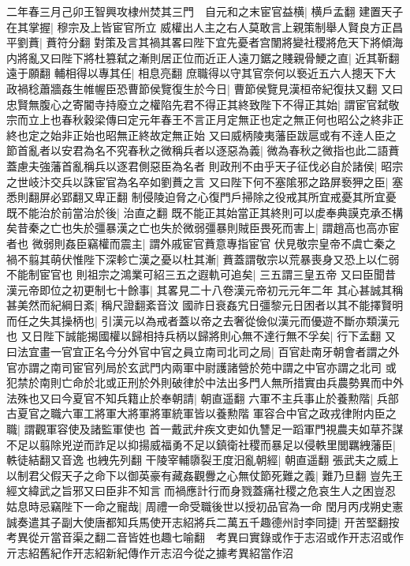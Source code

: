 二年春三月己卯王智興攻棣州焚其三門　自元和之末宦官益横|{
	横戶孟翻}
建置天子在其掌握|{
	穆宗及上皆宦官所立}
威權出人主之右人莫敢言上親策制舉人賢良方正昌平劉蕡|{
	蕡符分翻}
對策及言其禍其畧曰陛下宜先憂者宫闈將變社稷將危天下將傾海内將亂又曰陛下將杜篡弑之漸則居正位而近正人遠刀鋸之賤親骨鯁之直|{
	近其靳翻遠于願翻}
輔相得以專其任|{
	相息亮翻}
庶職得以守其官奈何以䙝近五六人摠天下大政禍稔蕭牆姦生帷幄臣恐曹節侯覽復生於今日|{
	曹節侯覽見漢桓帝紀復扶又翻}
又曰忠賢無腹心之寄閽寺持廢立之權陷先君不得正其終致陛下不得正其始|{
	謂宦官弑敬宗而立上也春秋穀梁傳曰定元年春王不言正月定無正也定之無正何也昭公之終非正終也定之始非正始也昭無正終故定無正始}
又曰威柄陵夷藩臣跋扈或有不逹人臣之節首亂者以安君為名不究春秋之微稱兵者以逐惡為義|{
	微為春秋之微指也此二語蕡蓋慮夫強藩首亂稱兵以逐君側惡臣為名者}
則政刑不由乎天子征伐必自於諸侯|{
	昭宗之世岐汴交兵以誅宦官為名卒如劉蕡之言}
又曰陛下何不塞隂邪之路屏䙝狎之臣|{
	塞悉則翻屏必郢翻又卑正翻}
制侵陵迫脅之心復門戶掃除之役戒其所宜戒憂其所宜憂既不能治於前當治於後|{
	治直之翻}
既不能正其始當正其終則可以䖍奉典謨克承丕構矣昔秦之亡也失於彊暴漢之亡也失於微弱彊暴則賊臣畏死而害上|{
	謂趙高也高亦宦者也}
微弱則姦臣竊權而震主|{
	謂外戚宦官蕡意專指宦官}
伏見敬宗皇帝不虞亡秦之禍不翦其萌伏惟陛下深軫亡漢之憂以杜其漸|{
	蕡蓋謂敬宗以荒暴喪身又恐上以仁弱不能制宦官也}
則祖宗之鴻業可紹三五之遐軌可追矣|{
	三五謂三皇五帝}
又曰臣聞昔漢元帝即位之初更制七十餘事|{
	其畧見二十八卷漢元帝初元元年二年}
其心甚誠其稱甚美然而紀綱日紊|{
	稱尺證翻紊音汶}
國祚日衰姦宄日彊黎元日困者以其不能擇賢明而任之失其操柄也|{
	引漢元以為戒者蓋以帝之去奢從儉似漢元而優遊不斷亦類漢元也}
又日陛下誠能揭國權以歸相持兵柄以歸將則心無不達行無不孚矣|{
	行下孟翻}
又曰法宜畫一官宜正名今分外官中官之員立南司北司之局|{
	百官赴南牙朝會者謂之外官亦謂之南司宦官列局於玄武門内兩軍中尉護諸營於苑中謂之中官亦謂之北司}
或犯禁於南則亡命於北或正刑於外則破律於中法出多門人無所措實由兵農勢異而中外法殊也又曰今夏官不知兵籍止於奉朝請|{
	朝直遥翻}
六軍不主兵事止於養勲階|{
	兵部古夏官之職六軍工將軍大將軍將軍統軍皆以養勲階}
軍容合中官之政戎律附内臣之職|{
	謂觀軍容使及諸監軍使也}
首一戴武弁疾文吏如仇讐足一蹈軍門視農夫如草芥謀不足以翦除兇逆而詐足以抑揚威福勇不足以鎮衛社稷而暴足以侵軼里閭羈絏藩臣|{
	軼徒結翻又音逸也絏先列翻}
干陵宰輔隳裂王度汨亂朝經|{
	朝直遥翻}
張武夫之威上以制君父假天子之命下以御英豪有藏姦觀釁之心無仗節死難之義|{
	難乃旦翻}
豈先王經文緯武之旨邪又曰臣非不知言而禍應計行而身戮蓋痛社稷之危哀生人之困豈忍姑息時忌竊陛下一命之寵哉|{
	周禮一命受職後世以授初品官為一命}
閏月丙戌朔史憲誠奏遣其子副大使唐都知兵馬使开志紹將兵二萬五千趣德州討李同捷|{
	开苦堅翻按考異從亓當音渠之翻二音皆姓也趣七喻翻　考異曰實錄或作于志沼或作开志沼或作亓志紹舊紀作开志紹新紀傳作亓志沼今從之據考異紹當作沼}
